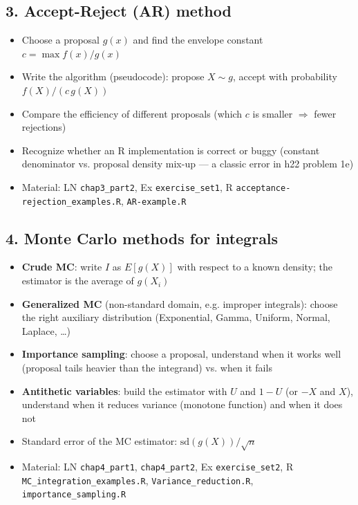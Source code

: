 \documentclass[11pt]{article}
\begin{document}
\subsection*{3. Accept-Reject (AR) method}
\begin{itemize}[leftmargin=*]
  \item Choose a proposal $g(x)$ and find the envelope constant $c = \max f(x)/g(x)$
  \item Write the algorithm (pseudocode): propose $X\sim g$, accept with probability $f(X)/(c\,g(X))$
  \item Compare the efficiency of different proposals (which $c$ is smaller $\Rightarrow$ fewer rejections)
  \item Recognize whether an R implementation is correct or buggy (constant denominator vs.
  proposal density mix-up --- a classic error in h22 problem 1e)
  \item Material: LN \texttt{chap3\_part2}, Ex \texttt{exercise\_set1}, R
  \texttt{acceptance-rejection\_examples.R}, \texttt{AR-example.R}
\end{itemize}

\subsection*{4. Monte Carlo methods for integrals}
\begin{itemize}[leftmargin=*]
  \item \textbf{Crude MC}: write $I$ as $E[g(X)]$ with respect to a known density; the
  estimator is the average of $g(X_i)$
  \item \textbf{Generalized MC} (non-standard domain, e.g. improper integrals): choose the
  right auxiliary distribution (Exponential, Gamma, Uniform, Normal, Laplace, \dots)
  \item \textbf{Importance sampling}: choose a proposal, understand when it works well
  (proposal tails heavier than the integrand) vs. when it fails
  \item \textbf{Antithetic variables}: build the estimator with $U$ and $1-U$ (or $-X$ and
  $X$), understand when it reduces variance (monotone function) and when it does not
  \item Standard error of the MC estimator: $\mathrm{sd}(g(X))/\sqrt{n}$
  \item Material: LN \texttt{chap4\_part1}, \texttt{chap4\_part2}, Ex \texttt{exercise\_set2}, R
  \texttt{MC\_integration\_examples.R}, \texttt{Variance\_reduction.R}, \texttt{importance\_sampling.R}
\end{itemize}
\end{document}
